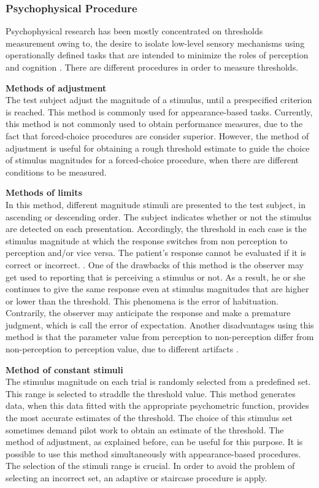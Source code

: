 \subsubsection{Psychophysical Procedure}
Psychophysical research has been mostly concentrated on thresholds measurement owing to, the desire to isolate low-level sensory mechanisms using operationally defined tasks that are intended to minimize the roles of perception and cognition \cite{psy_methods}. There are different procedures in order to measure thresholds.


\textbf{Methods of adjustment}
\\
The test subject adjust the magnitude of a stimulus, until a prespecified criterion is reached. This method is commonly used for appearance-based tasks. Currently, this method is not commonly used to obtain performance measures, due to the fact that forced-choice procedures are consider superior. However, the method of adjustment is useful for obtaining a rough threshold estimate to guide the choice of stimulus magnitudes for a forced-choice procedure, when there are different conditions to be measured.

\textbf{Methods of limits} 
\\
In this method, different magnitude stimuli are presented to the test subject, in ascending or descending order. The subject indicates whether or not the stimulus are detected on each presentation. Accordingly, the threshold in each case is the stimulus magnitude at which the response switches from non perception to perception and/or vice versa. The patient's response cannot be evaluated if it is correct or incorrect. \cite{chapter3}. One of the drawbacks of this method  is the observer may get used to reporting that is perceiving a stimulus or not. As a result, he or she  continues to give the same response even at stimulus magnitudes that are higher or lower than the threshold. This phenomena is the error of habituation. Contrarily, the observer may anticipate the response and make a premature judgment, which is call the error of expectation. Another disadvantages using this method is that the parameter value from perception to non-perception differ from non-perception to perception value, due to different artifacts \cite{hysteresis}.

\textbf{Method of constant stimuli}
\\
The stimulus magnitude on each trial is randomly selected from a predefined set. This range is selected to straddle the threshold value. This method generates data, when this data fitted with the appropriate psychometric function, provides the most accurate estimates of the threshold. The choice of this stimulus set sometimes demand pilot work to obtain an estimate of the threshold. The method of adjustment, as explained before, can be useful for this purpose. It is possible to use this method simultaneously with appearance-based procedures. The selection of the stimuli range is crucial. In order to avoid the problem of selecting an incorrect set, an adaptive or staircase procedure is apply.

